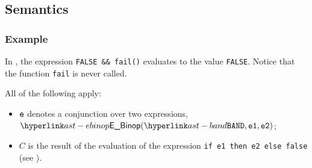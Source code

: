 \begin{mathpar}
\end{mathpar}

\subsection{Semantics}
\subsubsection{Example}
In ,
the expression \texttt{FALSE \&\& fail()} evaluates to the value \texttt{FALSE}. Notice that the function \texttt{fail} is never called.

\ProseParagraph
All of the following apply:
\begin{itemize}
\item $\ve$ denotes a conjunction over two expressions,
      $\EBinop(\BAND, \veone, \vetwo)$;
\item $C$ is the result of the evaluation of the expression
      \texttt{if e1 then e2 else false} (see ).
\end{itemize}

\FormallyParagraph
\begin{mathpar}
\end{mathpar}

